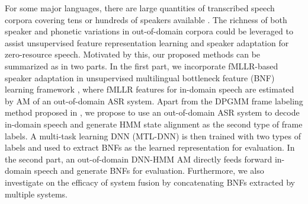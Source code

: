 \documentclass[a4paper]{article}
\begin{document}
For some major languages, there are large quantities of transcribed speech corpora covering tens or hundreds of speakers available \cite{paul1992design,LeeLoChingEtAl2002}.
The richness of both speaker and phonetic variations in out-of-domain corpora could be leveraged to assist unsupervised feature representation learning and speaker adaptation for zero-resource speech. Motivated by this, 
our proposed methods can be summarized as in two parts. In the first part, we incorporate fMLLR-based speaker adaptation in unsupervised multilingual bottleneck feature (BNF) learning framework \cite{chen2015parallel}, where fMLLR features for in-domain speech are estimated by AM of an out-of-domain ASR system. Apart from the DPGMM frame labeling method 
proposed in \cite{chen2015parallel}, we propose to use an out-of-domain ASR system to decode in-domain speech and generate HMM state alignment as the second type of frame labels.
A multi-task learning DNN (MTL-DNN) is then trained with two types of labels and used to extract BNFs as the learned representation for evaluation. In the second part, an out-of-domain DNN-HMM AM directly feeds forward in-domain speech and generate BNFs for evaluation. Furthermore, we also investigate on the efficacy of system fusion by concatenating BNFs extracted by multiple systems.
\end{document}
